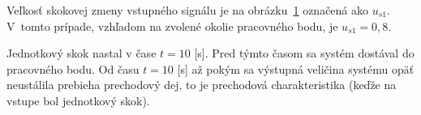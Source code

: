 \documentclass[a4paper, 10pt, ]{article}
\begin{document}
\begin{figure}[t]
	\centering


    \vspace{-4mm}

	\caption{}
	\label{graf6}

    \vspace{-4mm}

\end{figure}

Veľkosť skokovej zmeny vstupného signálu je na obrázku~\ref{graf6} označená ako $u_{s1}$. V~tomto prípade, vzhľadom na zvolené okolie pracovného bodu, je $u_{s1} = 0,8$.

Jednotkový skok nastal v čase $t=10$ [s]. Pred týmto časom sa systém dostával do pracovného bodu. Od času $t=10$ [s] až pokým sa výstupná veličina systému opäť neustálila prebieha prechodový dej, to je prechodová charakteristika (keďže na vstupe bol jednotkový skok).
\end{document}
